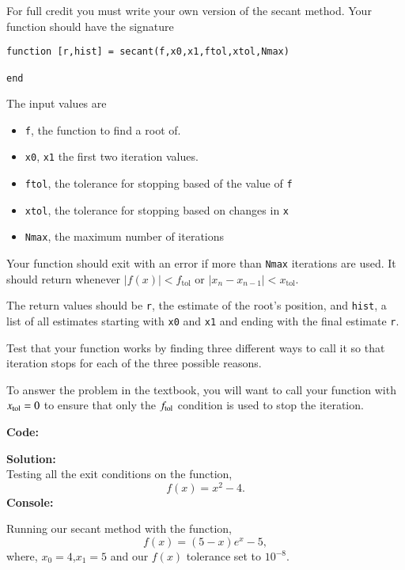 \documentclass[12pt]{article}
\makeatletter
\theoremstyle{homework}
\newenvironment{exercise}[1]
{\def\@currentlabel{#1}\exercisecore}
{\endexercisecore}
\newcommand{\localhead}[1]{\par\smallskip\noindent\textbf{#1}\nobreak\\}%
\newcommand\solution{\localhead{Solution:}}
\makeatother
\begin{document}
\begin{exercise}{Chapter 4: 2 (c)}
For full credit you must write your own version of the secant method.
Your function should have the signature

\begin{verbatim} 
function [r,hist] = secant(f,x0,x1,ftol,xtol,Nmax)

end
\end{verbatim}

The input values are
\begin{itemize}
\item \texttt{f}, the function to find a root of.
\item \texttt{x0}, \texttt{x1} the first two iteration values.
\item \texttt{ftol}, the tolerance for stopping based of the value of \texttt{f}
\item \texttt{xtol}, the tolerance for stopping based on changes in \texttt{x}
\item \texttt{Nmax}, the maximum number of iterations
\end{itemize}

Your function should exit with an error if more than \texttt{Nmax} iterations
are used.  It should return whenever $|f(x)|<f_{\text{tol}}$ or $|x_n-x_{n-1}|<x_{\text{tol}}$.

The return values should be \texttt{r}, the estimate of the root's position,
and \texttt{hist}, a list of all estimates starting with \texttt{x0} and \texttt{x1} and ending with the final estimate \texttt{r}.

Test that your function works by finding three different ways to call it
so that iteration stops for each of the three possible reasons.

To answer the problem in the textbook, you will want to call your function with 
$x_{\rm tol}=0$ to ensure that only the $f_{\rm tol}$ condition is used
to stop the iteration.
\end{exercise}


\textbf{Code:}



\solution Testing all the exit conditions on the function,
\begin{equation*}
  f(x) = x^2 - 4.
\end{equation*}
\textbf{Console:}

Running our secant method with the function,
\begin{equation*}
  f(x) = (5-x)e^x - 5,
\end{equation*}
where, $x_0 = 4$,$x_1 = 5$ and our $f(x)$ tolerance set to $10^{-8}$.  \\
\end{document}

